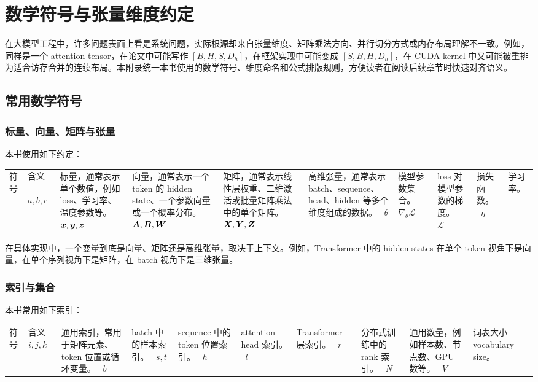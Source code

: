 
\chapter{数学符号与张量维度约定}

在大模型工程中，许多问题表面上看是系统问题，实际根源却来自张量维度、矩阵乘法方向、并行切分方式或内存布局理解不一致。例如，同样是一个 attention tensor，在论文中可能写作 $[B, H, S, D_h]$，在框架实现中可能变成 $[S, B, H, D_h]$，在 CUDA kernel 中又可能被重排为适合访存合并的连续布局。本附录统一本书使用的数学符号、维度命名和公式排版规则，方便读者在阅读后续章节时快速对齐语义。

\section{常用数学符号}

\subsection{标量、向量、矩阵与张量}

本书使用如下约定：

\begin{longtable}{p{}p{}}
\toprule
符号 & 含义 \
\midrule
$a, b, c$ & 标量，通常表示单个数值，例如 loss、学习率、温度参数等。 \
$\bm{x}, \bm{y}, \bm{z}$ & 向量，通常表示一个 token 的 hidden state、一个参数向量或一个概率分布。 \
$\bm{A}, \bm{B}, \bm{W}$ & 矩阵，通常表示线性层权重、二维激活或批量矩阵乘法中的单个矩阵。 \
$\bm{X}, \bm{Y}, \bm{Z}$ & 高维张量，通常表示 batch、sequence、head、hidden 等多个维度组成的数据。 \
$\theta$ & 模型参数集合。 \
$\nabla_{\theta}\mathcal{L}$ & loss 对模型参数的梯度。 \
$\mathcal{L}$ & 损失函数。 \
$\eta$ & 学习率。 \
\bottomrule
\end{longtable}

在具体实现中，一个变量到底是向量、矩阵还是高维张量，取决于上下文。例如，Transformer 中的 hidden states 在单个 token 视角下是向量，在单个序列视角下是矩阵，在 batch 视角下是三维张量。

\subsection{索引与集合}

本书常用如下索引：

\begin{longtable}{p{}p{}}
\toprule
符号 & 含义 \
\midrule
$i, j, k$ & 通用索引，常用于矩阵元素、token 位置或循环变量。 \
$b$ & batch 中的样本索引。 \
$s, t$ & sequence 中的 token 位置索引。 \
$h$ & attention head 索引。 \
$l$ & Transformer 层索引。 \
$r$ & 分布式训练中的 rank 索引。 \
$N$ & 通用数量，例如样本数、节点数、GPU 数等。 \
$V$ & 词表大小 vocabulary size。 \
\bottomrule
\end{longtable}

